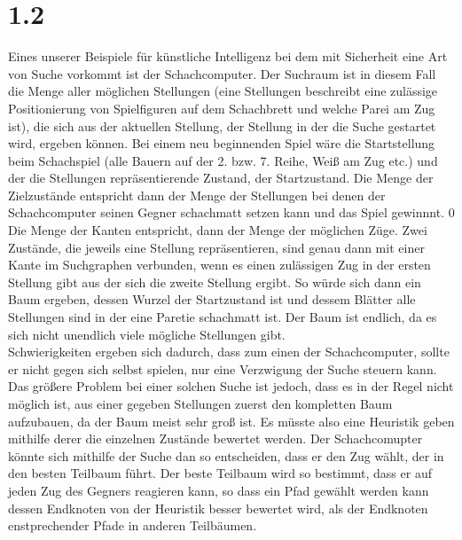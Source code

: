 \documentclass[a4paper,11pt,fleqn]{scrartcl}
\begin{document}
\section*{1.2}
Eines unserer Beispiele für künstliche Intelligenz bei dem mit Sicherheit eine Art von Suche vorkommt ist der Schachcomputer. Der Suchraum ist in diesem Fall die Menge aller möglichen Stellungen (eine Stellungen beschreibt eine zulässige Positionierung von Spielfiguren auf dem Schachbrett und welche Parei am Zug ist), die sich aus der aktuellen Stellung, der Stellung in der die Suche gestartet wird, ergeben können. 
Bei einem neu beginnenden Spiel wäre die Startstellung beim Schachspiel (alle Bauern auf der 2. bzw. 7. Reihe, Weiß am Zug etc.) und der die Stellungen repräsentierende Zustand, der Startzustand. Die Menge der Zielzustände entspricht dann der Menge der Stellungen bei denen der Schachcomputer seinen Gegner schachmatt setzen kann und das Spiel gewinnnt. 0
Die Menge der Kanten entspricht, dann der Menge der möglichen Züge. Zwei Zustände, die jeweils eine Stellung repräsentieren, sind genau dann mit einer Kante im Suchgraphen verbunden, wenn es einen zulässigen Zug in der ersten Stellung gibt aus der sich die zweite Stellung ergibt. So würde sich dann ein Baum ergeben, dessen Wurzel der Startzustand ist und dessem Blätter alle Stellungen sind in der eine Paretie schachmatt ist. Der Baum ist endlich, da es sich nicht unendlich viele mögliche Stellungen gibt.\\
Schwierigkeiten ergeben sich dadurch, dass zum einen der Schachcomputer, sollte er nicht gegen sich selbst spielen, nur eine Verzwigung der Suche steuern kann. Das größere Problem bei einer solchen Suche ist jedoch, dass es in der Regel nicht möglich ist, aus einer gegeben Stellungen zuerst den kompletten Baum aufzubauen, da der Baum meist sehr groß ist. Es müsste also eine Heuristik geben mithilfe derer die einzelnen Zustände bewertet werden. Der Schachcomupter könnte sich mithilfe der Suche dan so entscheiden, dass er den Zug wählt, der in den besten Teilbaum führt. Der beste Teilbaum wird so bestimmt, dass er auf jeden Zug des Gegners reagieren kann, so dass ein Pfad gewählt werden kann dessen Endknoten von der Heuristik besser bewertet wird, als der Endknoten enstprechender Pfade in anderen Teilbäumen.
\end{document}
